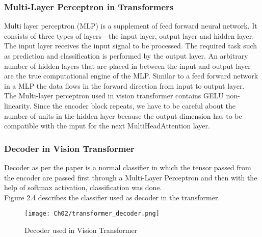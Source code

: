 \subsubsection{Multi-Layer Perceptron in Transformers}
Multi layer perceptron (MLP) is a supplement of feed forward neural network. It consists of three types of layers—the input layer, output layer and hidden layer. The input layer receives the input signal to be processed. The required task such as prediction and classification is performed by the output layer. An arbitrary number of hidden layers that are placed in between the input and output layer are the true computational engine of the MLP. Similar to a feed forward network in a MLP the data flows in the forward direction from input to output layer.
\\
The Multi-layer perceptron used in vision transformer contains GELU non-linearity\cite{hendrycks2020gaussian}. Since the encoder block repeats, we have to be careful about the number of units in the hidden layer because the output dimension has to be compatible with the input for the next MultiHeadAttention layer.

\subsubsection{Decoder in Vision Transformer}
Decoder as per the paper is a normal classifier in which the tensor passed from the encoder are passed first through a Multi-Layer Perceptron and then with the help of softmax activation, classification was done.
\\
Figure 2.4 describes the classifier used as decoder in the transformer.
\begin{figure}[h]
    \centering
    \texttt{[image: Ch02/transformer\_decoder.png]}
    \caption{Decoder used in Vision Transformer}
    \label{figure:5}
\end{figure}
\FloatBarrier